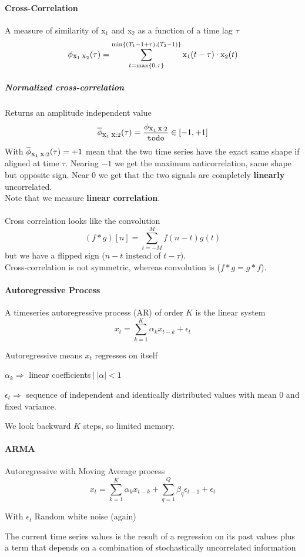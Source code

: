 \documentclass[10pt]{report}
\begin{document}
\paragraph{Cross-Correlation} A measure of similarity of x$_1$ and x$_2$ as a function of a time lag $\tau$ $$\phi_{\hbox{x}_1\:\hbox{x}_2}(\tau)=\sum_{t = \max\{0,\tau\}}^{\min\{(T_1 - 1 + \tau), (T_2 - 1)\}} \hbox{x}_1(t-\tau)\cdot \hbox{x}_2(t)$$
\subparagraph{Normalized cross-correlation} Returns an amplitude independent value %
$$\overline{\phi}_{\hbox{x}_1\:\hbox{x}:2}(\tau) = \frac{\phi_{\hbox{x}_1\:\hbox{x}:2}}{\hbox{\texttt{todo}}} \in [-1,+1]$$
With $\overline{\phi}_{\hbox{x}_1\:\hbox{x}:2}(\tau) = +1$ mean that the two time series have the exact same shape if aligned at time $\tau$. Nearing $-1$ we get the maximum anticorrelation, same shape but opposite sign. Near 0 we get that the two signals are completely \textbf{linearly} uncorrelated.\\
Note that we measure \textbf{linear correlation}.\\\\
Cross correlation looks like the convolution $$(f * g)[n]=\sum_{t=-M}^M f(n-t)g(t)$$ but we have a flipped sign ($n-t$ instead of $t-\tau$).\\
Cross-correlation is not symmetric, whereas convolution is ($f * g = g * f$).
\paragraph{Autoregressive Process} A timeseries autoregressive process (AR) of order $K$ is the linear system $$x_t = \sum_{k=1}^K \alpha_k x_{t-k} + \epsilon_t$$\begin{list}{}{}
	\item Autoregressive means $x_t$ regresses on itself
	\item $\alpha_k \Rightarrow$ linear coefficients$\:|\:|\alpha|<1$
	\item $\epsilon_t\Rightarrow$ sequence of independent and identically distributed values with mean 0 and fixed variance.
	\item We look backward $K$ steps, so limited memory.
\end{list}
\paragraph{ARMA} Autoregressive with Moving Average process $$x_t = \sum_{k=1}^K \alpha_k x_{t-k} + \sum_{q=1}^Q \beta_q\epsilon_{t-1}+\epsilon_t$$
\begin{list}{}{}
	\item With $\epsilon_t$ Random white noise (again)
	\item The current time series values is the result of a regression on its past values plus a term that depends on a combination of stochastically uncorrelated information
\end{list}
\end{document}
